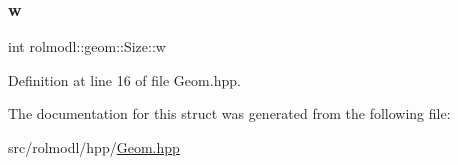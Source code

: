 \subsubsection{\texorpdfstring{w}{w}}
{\footnotesize\ttfamily int rolmodl\+::geom\+::\+Size\+::w}



Definition at line 16 of file Geom.\+hpp.



The documentation for this struct was generated from the following file\+:\begin{DoxyCompactItemize}
\item 
src/rolmodl/hpp/\mbox{\hyperlink{_geom_8hpp}{Geom.\+hpp}}\end{DoxyCompactItemize}
